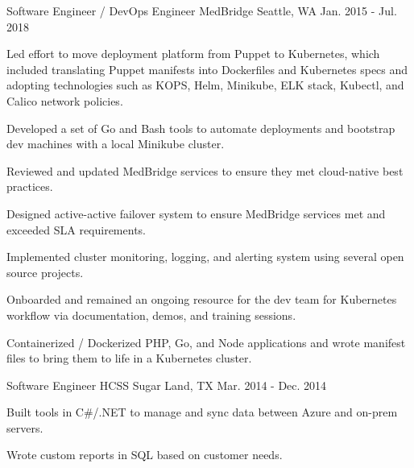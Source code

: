 \begin{cventries}

\cventry
{Software Engineer / DevOps Engineer} %
{MedBridge} %
{Seattle, WA} %
{Jan. 2015 - Jul. 2018} %
{ %
\begin{cvitems}
\item {Led effort to move deployment platform from Puppet to Kubernetes, which included translating Puppet manifests into Dockerfiles and Kubernetes specs and adopting technologies such as KOPS, Helm, Minikube, ELK stack, Kubectl, and Calico network policies.}
\item {Developed a set of Go and Bash tools to automate deployments and bootstrap dev machines with a local Minikube cluster.}
\item {Reviewed and updated MedBridge services to ensure they met cloud-native best practices.}
\item {Designed active-active failover system to ensure MedBridge services met and exceeded SLA requirements.}
\item {Implemented cluster monitoring, logging, and alerting system using several open source projects.} 
\item {Onboarded and remained an ongoing resource for the dev team for Kubernetes workflow via documentation, demos, and training sessions.}
\item {Containerized / Dockerized PHP, Go, and Node applications and wrote manifest files to bring them to life in a Kubernetes cluster.}
\end{cvitems}
}



\cventry
{Software Engineer} %
{HCSS} %
{Sugar Land, TX} %
{Mar. 2014 - Dec. 2014} %
{
\begin{cvitems}
\item {Built tools in C\#/.NET to manage and sync data between Azure and on-prem servers.}
\item {Wrote custom reports in SQL based on customer needs.}
\end{cvitems}
}


\end{cventries}
